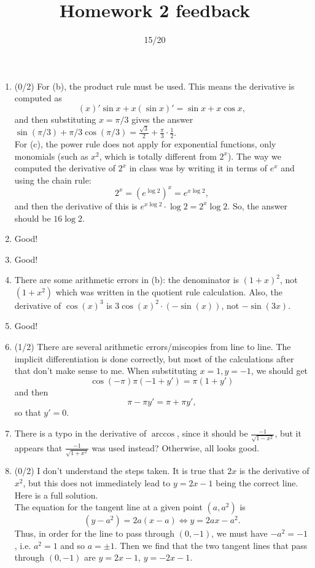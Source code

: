 \documentclass{article}
\title{Homework 2 feedback}
\author{15/20}
\date{}
\begin{document}
\maketitle
\begin{enumerate}
	\item (0/2) For (b), the product rule must be used. This means the derivative is computed as
		\[
			(x)' \sin x + x (\sin x)' = \sin x + x \cos x,
		\]
		and then substituting $x = \pi/3$ gives the answer $\sin(\pi/3) + \pi/3 \cos(\pi/3) = \frac{\sqrt{3}}{2} + \frac{\pi}{3} \cdot \frac{1}{2}$.\\
		For (c), the power rule does not apply for exponential functions, only monomials (such as $x^{2}$, which is totally different from $2^{x}$). The way we computed the derivative of $2^{x}$ in class was by writing it in terms of $e^{x}$ and using the chain rule:
		\[
			2^{x} = (e^{\log 2})^{x} = e^{x \log 2},
		\]
		and then the derivative of this is $e^{x \log 2} \cdot \log 2 = 2^{x} \log 2$. So, the answer should be $16 \log 2$.
	\item Good!
	\item Good!
	\item There are some arithmetic errors in (b): the denominator is $(1+x)^{2}$, not $(1 + x^{2})$ which was written in the quotient rule calculation. Also, the derivative of $\cos(x)^{3}$ is $3 \cos(x)^{2} \cdot (- \sin(x))$, not $- \sin(3x)$. 
	\item Good!
	\item (1/2) There are several arithmetic errors/miscopies from line to line. The implicit differentiation is done correctly, but most of the calculations after that don't make sense to me. When substituting $x = 1, y = -1$, we should get
		\[
			\cos(-\pi) \pi (-1 + y') = \pi(1 + y')
		\]
		and then
		\[
			\pi - \pi y' = \pi + \pi y',
		\]
		so that $y' = 0$. 
	\item There is a typo in the derivative of $\operatorname{arccos}$, since it should be $\frac{-1}{\sqrt{1 - x^{2}}}$, but it appears that $\frac{-1}{\sqrt{1 + x^{2}}}$ was used instead? Otherwise, all looks good.
	\item (0/2) I don't understand the steps taken. It is true that $2x$ is the derivative of $x^{2}$, but this does not immediately lead to $y = 2x-1$ being the correct line. Here is a full solution.\\

		The equation for the tangent line at a given point $(a,a^{2})$ is
		\[
			(y - a^{2}) = 2a(x - a) \Leftrightarrow y = 2ax - a^{2}.
		\]
		Thus, in order for the line to pass through $(0, -1)$, we must have $-a^{2} =  -1$, i.e. $a^{2} = 1$ and so $a = \pm 1$. Then we find that the two tangent lines that pass through $(0, -1)$ are $y = 2x - 1$, $y = -2x - 1$.
\end{enumerate}
\end{document}

